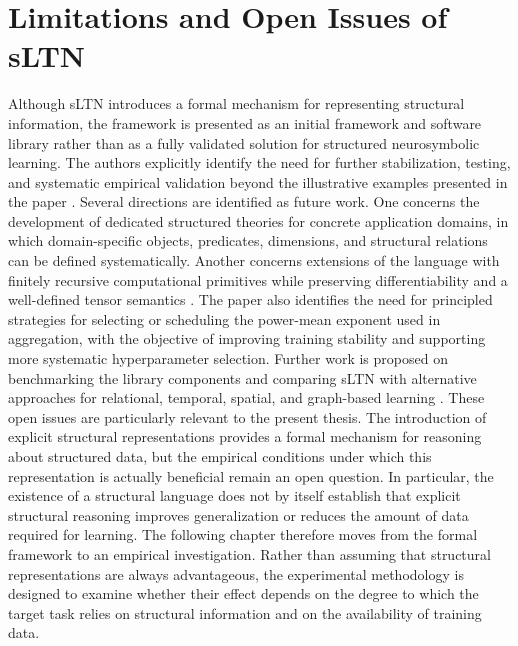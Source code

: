 \section{Limitations and Open Issues of sLTN}
\noindent
Although sLTN introduces a formal mechanism for representing structural information, the framework is presented as an initial framework and software library rather than as a fully validated solution for structured neurosymbolic learning. The authors explicitly identify the need for further stabilization, testing, and systematic empirical validation beyond the illustrative examples presented in the paper \cite{rinaldi2026sltn}.
Several directions are identified as future work. One concerns the development of dedicated structured theories for concrete application domains, in which domain-specific objects, predicates, dimensions, and structural relations can be defined systematically. Another concerns extensions of the language with finitely recursive computational primitives while preserving differentiability and a well-defined tensor semantics \cite{rinaldi2026sltn}.
The paper also identifies the need for principled strategies for selecting or scheduling the power-mean exponent used in aggregation, with the objective of improving training stability and supporting more systematic hyperparameter selection. Further work is proposed on benchmarking the library components and comparing sLTN with alternative approaches for relational, temporal, spatial, and graph-based learning \cite{rinaldi2026sltn}.
These open issues are particularly relevant to the present thesis. The introduction of explicit structural representations provides a formal mechanism for reasoning about structured data, but the empirical conditions under which this representation is actually beneficial remain an open question. In particular, the existence of a structural language does not by itself establish that explicit structural reasoning improves generalization or reduces the amount of data required for learning.
The following chapter therefore moves from the formal framework to an empirical investigation. Rather than assuming that structural representations are always advantageous, the experimental methodology is designed to examine whether their effect depends on the degree to which the target task relies on structural information and on the availability of training data.
